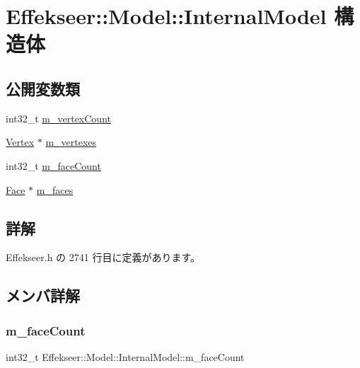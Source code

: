 \hypertarget{struct_effekseer_1_1_model_1_1_internal_model}{}\section{Effekseer\+:\+:Model\+:\+:Internal\+Model 構造体}
\label{struct_effekseer_1_1_model_1_1_internal_model}
\subsection*{公開変数類}
\begin{DoxyCompactItemize}
\item 
int32\+\_\+t \mbox{\hyperlink{struct_effekseer_1_1_model_1_1_internal_model_a6b90b5a53696efdabac0d4708dcb3550}{m\+\_\+vertex\+Count}}
\item 
\mbox{\hyperlink{struct_effekseer_1_1_model_1_1_vertex}{Vertex}} $\ast$ \mbox{\hyperlink{struct_effekseer_1_1_model_1_1_internal_model_a8a41ac246ef524cf4aa0197b2ce1b449}{m\+\_\+vertexes}}
\item 
int32\+\_\+t \mbox{\hyperlink{struct_effekseer_1_1_model_1_1_internal_model_a0600f7243cd74d0215e97f7083aef405}{m\+\_\+face\+Count}}
\item 
\mbox{\hyperlink{struct_effekseer_1_1_model_1_1_face}{Face}} $\ast$ \mbox{\hyperlink{struct_effekseer_1_1_model_1_1_internal_model_a3379f247818edb1c0abcdb16d237f309}{m\+\_\+faces}}
\end{DoxyCompactItemize}


\subsection{詳解}


 Effekseer.\+h の 2741 行目に定義があります。



\subsection{メンバ詳解}
\mbox{\label{struct_effekseer_1_1_model_1_1_internal_model_a0600f7243cd74d0215e97f7083aef405}} 
\subsubsection{\texorpdfstring{m\+\_\+face\+Count}{m\_faceCount}}
{\footnotesize\ttfamily int32\+\_\+t Effekseer\+::\+Model\+::\+Internal\+Model\+::m\+\_\+face\+Count}



